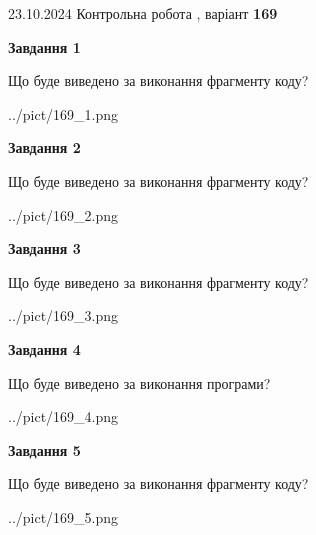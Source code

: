 \documentclass[12pt, ukrainian]{article}
\begin{document}
{\Large{23.10.2024 Контрольна робота , варіант  \No \textbf { 169 }\par}}
{
\begin {large}
{\begin {center}\textbf{Завдання 1}\end {center}}

Що буде виведено за виконання фрагменту коду?\par
\begin{center}
	{../pict/169_1.png}
\end{center}
\newpage

{\begin {center}\textbf{Завдання 2}\end {center}}

Що буде виведено за виконання фрагменту коду?\par
\begin{center}
	{../pict/169_2.png}
\end{center}
\newpage

{\begin {center}\textbf{Завдання 3}\end {center}}

Що буде виведено за виконання фрагменту коду?\par
\begin{center}
	{../pict/169_3.png}
\end{center}
\newpage

{\begin {center}\textbf{Завдання 4}\end {center}}

Що буде виведено за виконання програми?\par
\begin{center}
	{../pict/169_4.png}
\end{center}
\newpage

{\begin {center}\textbf{Завдання 5}\end {center}}

Що буде виведено за виконання фрагменту коду?\par
\begin{center}
	{../pict/169_5.png}
\end{center}
\newpage


\end{large}}
\end{document}
